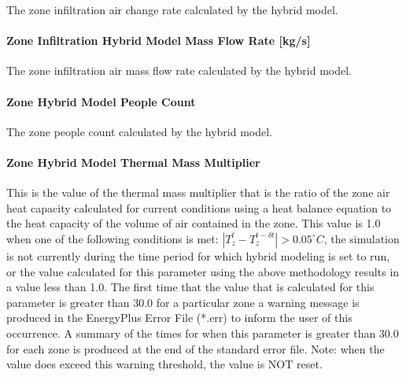 The zone infiltration air change rate calculated by the hybrid model.

\paragraph{Zone Infiltration Hybrid Model Mass Flow Rate {[}kg/s{]}}\label{zone-infiltration-hybrid-model-air-mass-flow-rate}

The zone infiltration air mass flow rate calculated by the hybrid model.

\paragraph{Zone Hybrid Model People Count}\label{zone-infiltration-hybrid-model-people-count}

The zone people count calculated by the hybrid model.

\paragraph{Zone Hybrid Model Thermal Mass Multiplier}\label{zone-infiltration-hybrid-model-thermal-mass-multiplier}

This is the value of the thermal mass multiplier that is the ratio of the zone air heat capacity calculated for current conditions using a heat balance equation to the heat capacity of the volume of air contained in the zone.  This value is 1.0 when one of the following conditions is met: $|T_z^t - T_z^{t-\delta t}| > 0.05^{\circ}C$, the simulation is not currently during the time period for which hybrid modeling is set to run, or the value calculated for this parameter using the above methodology results in a value less than 1.0.  The first time that the value that is calculated for this parameter is greater than 30.0 for a particular zone a warning message is produced in the EnergyPlus Error File (*.err) to inform the user of this occurrence.  A summary of the times for when this parameter is greater than 30.0 for each zone is produced at the end of the standard error file.  Note: when the value does exceed this warning threshold, the value is NOT reset.